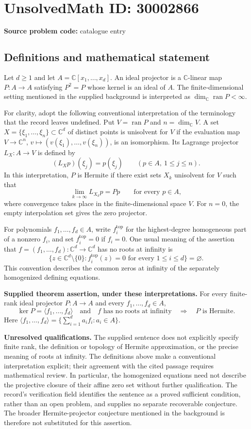 \documentclass[11pt]{article}
\newcommand{\C}{\mathbb{C}}
\begin{document}
\section*{UnsolvedMath ID: 30002866}
\textbf{Source problem code:} catalogue entry
\subsection{Definitions and mathematical statement}
Let \(d\geq 1\) and let \(A=\C[x_1,\ldots,x_d]\). An ideal projector is a \(\C\)-linear map \(P:A\to A\) satisfying \(P^2=P\) whose kernel is an ideal of \(A\). The finite-dimensional setting mentioned in the supplied background is interpreted as \(\dim_{\C}\operatorname{ran}P<\infty\).

For clarity, adopt the following conventional interpretation of the terminology that the record leaves undefined. Put \(V=\operatorname{ran}P\) and \(n=\dim_{\C}V\). A set \(X=\{\xi_1,\ldots,\xi_n\}\subset\C^d\) of distinct points is unisolvent for \(V\) if the evaluation map \(V\to\C^n\), \(v\mapsto(v(\xi_1),\ldots,v(\xi_n))\), is an isomorphism. Its Lagrange projector \(L_X:A\to V\) is defined by
\[
 (L_Xp)(\xi_j)=p(\xi_j)\qquad(p\in A,\ 1\leq j\leq n).
\]
In this interpretation, \(P\) is Hermite if there exist sets \(X_k\) unisolvent for \(V\) such that
\[
 \lim_{k\to\infty}L_{X_k}p=Pp\qquad\text{for every }p\in A,
\]
where convergence takes place in the finite-dimensional space \(V\). For \(n=0\), the empty interpolation set gives the zero projector.

For polynomials \(f_1,\ldots,f_d\in A\), write \(f_i^{\mathrm{top}}\) for the highest-degree homogeneous part of a nonzero \(f_i\), and set \(f_i^{\mathrm{top}}=0\) if \(f_i=0\). One usual meaning of the assertion that \(f=(f_1,\ldots,f_d):\C^d\to\C^d\) has no roots at infinity is
\[
 \bigl\{z\in\C^d\setminus\{0\}:f_i^{\mathrm{top}}(z)=0\text{ for every }1\leq i\leq d\bigr\}=\varnothing.
\]
This convention describes the common zeros at infinity of the separately homogenized defining equations.

\textbf{Supplied theorem assertion, under these interpretations.} For every finite-rank ideal projector \(P:A\to A\) and every \(f_1,\ldots,f_d\in A\),
\[
 \ker P=\langle f_1,\ldots,f_d\rangle
 \quad\text{and}\quad
 f\text{ has no roots at infinity}
 \quad\Longrightarrow\quad
 P\text{ is Hermite}.
\]
Here \(\langle f_1,\ldots,f_d\rangle=\{\sum_{i=1}^d a_i f_i:a_i\in A\}\).

\textbf{Unresolved qualifications.} The supplied sentence does not explicitly specify finite rank, the definition or topology of Hermite approximation, or the precise meaning of roots at infinity. The definitions above make a conventional interpretation explicit; their agreement with the cited passage requires mathematical review. In particular, the homogenized equations need not describe the projective closure of their affine zero set without further qualification. The record's verification field identifies the sentence as a proved sufficient condition, rather than an open problem, and supplies no separate recoverable conjecture. The broader Hermite-projector conjecture mentioned in the background is therefore not substituted for this assertion.
\end{document}
